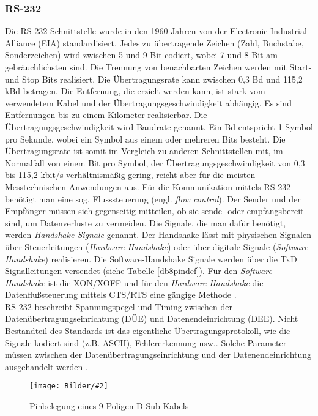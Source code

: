 \documentclass[
fontsize=12pt, 
paper=a4, 
BCOR=10mm, 
twoside=false,
 DIV=10, 
 headsepline, 
 footsepline
 ]{scrartcl}
\def\bild#1#2#3#4#5#6{%
\begin{figure}[h!] %
\centering
\texttt{[image: Bilder/\#2]}
\vspace{#3}
\caption[#4]{#5}\label{#6}
\end{figure}
}
\begin{document}
\subsubsection{RS-232}

Die RS-232 Schnittstelle wurde in den 1960 Jahren von der Electronic Industrial Alliance (EIA) standardisiert. Jedes zu übertragende Zeichen (Zahl, Buchstabe, Sonderzeichen) wird zwischen 5 und 9 Bit codiert, wobei 7 und 8 Bit am gebräuchlichsten sind. Die Trennung von benachbarten Zeichen werden mit Start- und Stop Bits realisiert. Die Übertragungsrate kann zwischen 0,3 Bd und 115,2 kBd betragen. Die Entfernung, die erzielt werden kann, ist stark vom verwendetem Kabel und der Übertragungsgeschwindigkeit abhängig. Es sind Entfernungen bis zu einem Kilometer realisierbar. Die Übertragungsgeschwindigkeit wird Baudrate genannt. Ein Bd entspricht 1 Symbol pro Sekunde, wobei ein Symbol aus einem oder mehreren Bits besteht. Die Übertragungsrate ist somit im Vergleich zu anderen Schnittstellen mit, im Normalfall von einem Bit pro Symbol, der Übertragungsgeschwindigkeit von 0,3 bis 115,2 kbit/s verhältnismäßig gering, reicht aber für die meisten Messtechnischen Anwendungen aus. Für die Kommunikation mittels RS-232 benötigt man eine sog. Flusssteuerung (engl. \textit{flow control}). Der Sender und der Empfänger müssen sich gegenseitig mitteilen, ob sie sende- oder empfangsbereit sind, um Datenverluste zu vermeiden. Die Signale, die man dafür benötigt, werden \textit{Handshake-Signale} genannt. Der Handshake lässt mit physischen Signalen über Steuerleitungen (\textit{Hardware-Handshake}) oder über digitale Signale (\textit{Software-Handshake}) realisieren. Die Software-Handshake Signale werden über die TxD Signalleitungen versendet (siehe Tabelle \ref{db8pindef}). Für den \textit{Software-Handshake} ist die XON/XOFF und für den \textit{Hardware Handshake} die Datenflußsteuerung mittels CTS/RTS eine gängige Methode \cite[S. 480 f.]{Busch2015}. \\

RS-232 beschreibt Spannungspegel und Timing zwischen der Datenübertragungseinrichtung (DÜE) und Datenendeinrichtung (DEE). Nicht Bestandteil des Standards ist das eigentliche Übertragungsprotokoll, wie die Signale kodiert sind (z.B. ASCII), Fehlererkennung usw.. Solche Parameter müssen zwischen der Datenübertragungseinrichtung und der Datenendeinrichtung ausgehandelt werden \cite{wasistrs232}.

\bild{.9}
{db9_stecker.png}
{0em}
{Pinbelegung eines 9-Poligen D-Sub Kabels}
{Pinbelegung eines 9-Poligen D-Sub Kabels \cite[S. 222]{hughes2010real}}
{db9}
\end{document}
